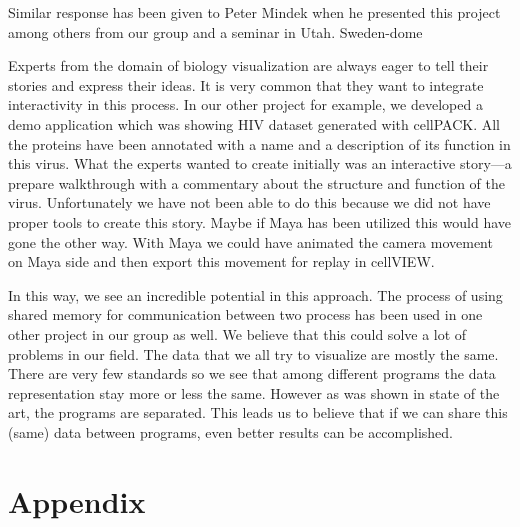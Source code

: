 \documentclass[
  digital, %
  table,   %
  nolof,     %
  nolot,     %
  oneside,
]{fithesis3}
\begin{document}
Similar response has been given to Peter Mindek when he presented this project among others from our group and a seminar in Utah. Sweden-dome

Experts from the domain of biology visualization are always eager to tell their stories and express their ideas. It is very common that they want to integrate interactivity in this process. In our other project for example, we developed a demo application which was showing HIV dataset generated with cellPACK. All the proteins have been annotated with a name and a description of its function in this virus. What the experts wanted to create initially was an interactive story—a prepare walkthrough with a commentary about the structure and function of the virus. Unfortunately we have not been able to do this because we did not have proper tools to create this story. Maybe if Maya has been utilized this would have gone the other way. With Maya we could have animated the camera movement on Maya side and then export this movement for replay in cellVIEW.

In this way, we see an incredible potential in this approach. The process of using shared memory for communication between two process has been used in one other project in our group as well. We believe that this could solve a lot of problems in our field. The data that we all try to visualize are mostly the same. There are very few standards so we see that among different programs the data representation stay more or less the same. However as was shown in state of the art, the programs are separated. This leads us to believe that if we can share this (same) data between programs, even better results can be accomplished.

\newpage
\printbibliography[heading=bibintoc]

\appendix %
\chapter{Appendix}
\end{document}
